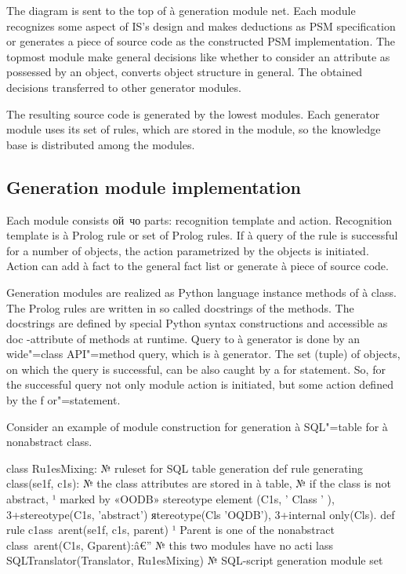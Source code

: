 \documentclass{intech}
\begin{document}
The diagram is sent to the top of à generation module net. Each module recognizes some aspect of IS's design and makes deductions as PSM specification or generates a piece of source code as the constructed PSM implementation. The topmost module make general decisions like whether to consider an attribute as possessed by an object, converts object structure in general. The obtained decisions transferred to other generator modules.

The resulting source code is generated by the lowest modules. Each generator module uses its set of rules, which are stored in the module, so the knowledge base is distributed among the modules.

\subsection{Generation module implementation}

Each module consists ой~чо parts: recognition template and action. Recognition template is à Prolog rule or set of Prolog rules. If à query of the rule is successful for a number of objects, the action parametrized by the objects is initiated. Action can add à fact to the general fact list or generate à piece of source code.

Generation modules are realized as Python language \cite{b6} instance methods of à class. The Prolog rules are written in so called docstrings of the methods. The docstrings are defined by special Python syntax constructions and accessible as doc -attribute of methods at runtime. Query to à generator is done by an wide"=class API"=method query, which is à generator. The set (tuple) of objects, on which the query is successful, can be also caught by a for statement. So, for the successful query not only module action is initiated, but some action defined by the f or"=statement.

Consider an example of module construction for generation à SQL"=table for à nonabstract class.

class Ru1esMixing:
№ ruleset for SQL table generation
def rule generating class(se1f, c1s):
№ the class attributes are stored in à table,
№ if the class is not abstract,
¹ marked by «OODB» stereotype
element (C1s, ' Class ' ),
3+stereotype(C1s, 'abstract')
яtereotype(Cls 'OQDB'),
3+internal only(Cls).
def rule c1ass~arent(se1f, c1s, parent)
¹ Parent is one of the nonabstract
class~arent(C1s, Gparent):â€”
№ this two modules have no acti
lass SQLTranslator(Translator, Ru1esMixing)
№ SQL-script generation module set
\end{document}
